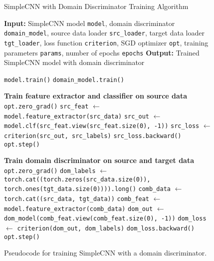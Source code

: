 \documentclass[conference]{IEEEtran}
\begin{document}
\begin{figure}[h]
\centering
\begin{minipage}{.5\textwidth}
\begin{algorithm}[H]
\caption{SimpleCNN with Domain Discriminator Training Algorithm}
\label{alg:simplecnn_training_domain}
\begin{algorithmic}[1]
\scriptsize 
\STATE \textbf{Input:} SimpleCNN model \texttt{model},
domain discriminator \texttt{domain\_model},
source data loader \texttt{src\_loader},
target data loader \texttt{tgt\_loader},
loss function \texttt{criterion},
SGD optimizer \texttt{opt},
training parameters \texttt{params},
number of epochs \texttt{epochs}
\STATE \textbf{Output:} Trained SimpleCNN model with domain discriminator

\STATE \texttt{model.train()}
\STATE \texttt{domain\_model.train()}

        \STATE \textbf{Train feature extractor and classifier on source data}
        \STATE \texttt{opt.zero\_grad()}
        \STATE \texttt{src\_feat} $\leftarrow$ \texttt{model.feature\_extractor(src\_data)}
        \STATE \texttt{src\_out} $\leftarrow$ \texttt{model.clf(src\_feat.view(src\_feat.size(0), -1))}
        \STATE \texttt{src\_loss} $\leftarrow$ \texttt{criterion(src\_out, src\_labels)}
        \STATE \texttt{src\_loss.backward()}
        \STATE \texttt{opt.step()}

        \STATE \textbf{Train domain discriminator on source and target data}
        \STATE \texttt{opt.zero\_grad()}
        \STATE \texttt{dom\_labels} $\leftarrow$ \texttt{torch.cat((torch.zeros(src\_data.size(0)), torch.ones(tgt\_data.size(0)))).long()}
        \STATE \texttt{comb\_data} $\leftarrow$ \texttt{torch.cat((src\_data, tgt\_data))}
        \STATE \texttt{comb\_feat} $\leftarrow$ \texttt{model.feature\_extractor(comb\_data)}
        \STATE \texttt{dom\_out} $\leftarrow$ \texttt{dom\_model(comb\_feat.view(comb\_feat.size(0), -1))}
        \STATE \texttt{dom\_loss} $\leftarrow$ \texttt{criterion(dom\_out, dom\_labels)}
        \STATE \texttt{dom\_loss.backward()}
        \STATE \texttt{opt.step()}
    \ENDFOR
\ENDFOR

\end{algorithmic}
\end{algorithm}
\end{minipage}
\caption{Pseudocode for training SimpleCNN with a domain discriminator.}
\end{figure}
\end{document}
